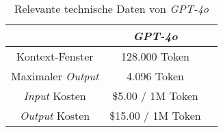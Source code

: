 \bgroup
\def\arraystretch{2}
\begin{table}[!h]
	\vspace{.5cm}
	\begin{center}
		\begin{tabular}{|c||c|c|}
			\hline 
			& \textit{GPT-4o} \\
			\hline 
			\hline
			Kontext-Fenster & 128.000 Token \\
			\hline
			Maximaler \textit{Output} & 4.096 Token 
			 \\
			\hline
			\textit{Input} Kosten & \$5.00 / 1M Token \\
			\hline
			\textit{Output} Kosten & \$15.00 / 1M Token \\
			\hline
		\end{tabular} 
	\end{center}
	\caption{Relevante technische Daten von \textit{GPT-4o}}
	\label{fig:gpt}
\end{table}
\egroup